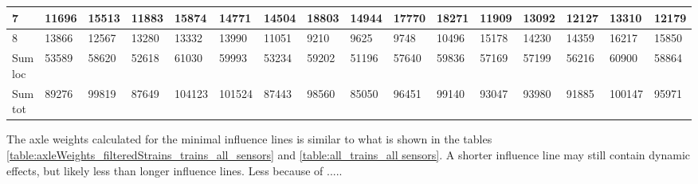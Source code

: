 \begin{sidewaystable}[htpb]
{\begin{tabularx}{\textheight}{ |l|X|X|X|X|X|X|X|X|X|X|X|X|X|X|X| }
		\hline
		7 & 11696   &    15513   &    11883   &    15874   &    14771   &    14504   &    18803   &    14944   &    17770   &    18271    &   11909    &   13092    &   12127   &    13310 &	12179 \\
		\hline
		8 & 13866   &    12567   &    13280   &    13332   &    13990   &    11051   &     9210   &     9625   &     9748   &    10496    &   15178    &   14230    &   14359   &    16217 &	15850 \\
		\hline
		Sum loc & 53589   &    58620   &    52618   &    61030   &    59993   &    53234   &    59202   &    51196   &    57640   &    59836    &   57169    &   57199    &   56216   &    60900 &	58864 \\
		\hline
		Sum tot & 89276   &    99819   &    87649   &   104123   &   101524   &    87443   &    98560   &    85050   &    96451   &    99140    &   93047    &   93980    &   91885   &   100147 &	95971 \\
		\bottomrule
	\end{tabularx}}
	\caption{Table of axle weights for averaged influence lines, where strains have been filtered, all trains}
	\label{table:axleWeights_filteredStrains_trains_all_sensors}
\end{sidewaystable}
The axle weights calculated for the minimal influence lines is similar to what is shown in the tables \ref{table:axleWeights_filteredStrains_trains_all_sensors} and \ref{table:all_trains_all sensors}. A shorter influence line may still contain dynamic effects, but likely less than longer influence lines. Less because of .....
